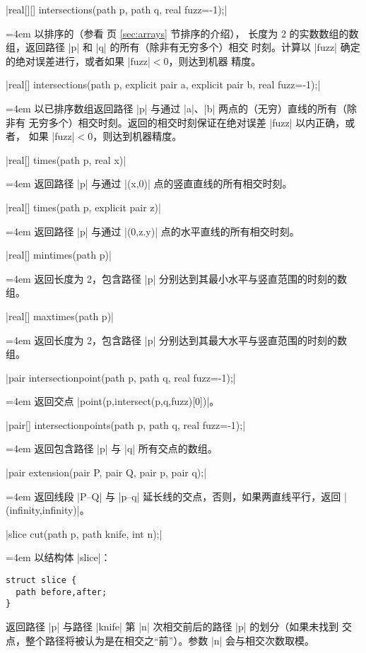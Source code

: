 \documentclass[nofonts,CJKnormalspaces]{ctexbook}[2009/05/20]
\makeatletter
\newenvironment{funclist}{\trivlist
  \parindent=0pt
\item[]
  \def\item{\medskip\par\leftskip=0pt}
  \def\go{\par\leftskip=4em}}
{\endtrivlist}
\newenvironment{typelist}{\itemize
  \let\old@item\@item
  \def\@item[##1]{\expandafter\old@item[\ttfamily\color{type!50!black}##1]}}
{\enditemize}
\makeatother
\begin{document}
\begin{typelist}
\begin{funclist}
\item |real[][] intersections(path p, path q, real fuzz=-1);| \go
  以排序的（参看 \pageref{sec:arrays} 页 \ref{sec:arrays} 节排序的介绍），
  长度为 2 的实数数组的数组，返回路径 |p| 和 |q| 的所有（除非有无穷多个）相交
  时刻。计算以 |fuzz| 确定的绝对误差进行，或者如果 |fuzz|${}<0$，则达到机器
  精度。

\item |real[] intersections(path p, explicit pair a, explicit pair b, real fuzz=-1);| \go
  以已排序数组返回路径 |p| 与通过 |a|、|b| 两点的（无穷）直线的所有（除非有
  无穷多个）相交时刻。返回的相交时刻保证在绝对误差 |fuzz| 以内正确，或者，
  如果 |fuzz|${}<0$，则达到机器精度。

\item |real[] times(path p, real x)| \go
  返回路径 |p| 与通过 |(x,0)| 点的竖直直线的所有相交时刻。

\item |real[] times(path p, explicit pair z)| \go
  返回路径 |p| 与通过 |(0,z.y)| 点的水平直线的所有相交时刻。

\item |real[] mintimes(path p)| \go
  返回长度为 2，包含路径 |p| 分别达到其最小水平与竖直范围的时刻的数组。

\item |real[] maxtimes(path p)| \go
  返回长度为 2，包含路径 |p| 分别达到其最大水平与竖直范围的时刻的数组。

\item |pair intersectionpoint(path p, path q, real fuzz=-1);| \go
  返回交点 |point(p,intersect(p,q,fuzz)[0])|。

\item |pair[] intersectionpoints(path p, path q, real fuzz=-1);| \go
  返回包含路径 |p| 与 |q| 所有交点的数组。

\item |pair extension(pair P, pair Q, pair p, pair q);| \go
  返回线段 |P--Q| 与 |p--q| 延长线的交点，否则，如果两直线平行，返回
  |(infinity,infinity)|。

\item |slice cut(path p, path knife, int n);| \go
  以结构体 |slice|：
\begin{lstlisting}
struct slice {
  path before,after;
}
\end{lstlisting}
  返回路径 |p| 与路径 |knife| 第 |n| 次相交前后的路径 |p| 的划分（如果未找到
  交点，整个路径将被认为是在相交之“前”）。参数 |n| 会与相交次数取模。


\end{funclist}
\end{typelist}
\end{document}
